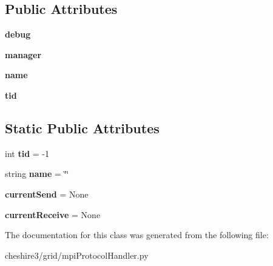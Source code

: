 \subsection*{Public Attributes}
\begin{DoxyCompactItemize}
\item 
\hypertarget{classcheshire3_1_1grid_1_1mpi_protocol_handler_1_1_task_a5792f59d89dd9883421c69d41344d718}{{\bfseries debug}}\label{classcheshire3_1_1grid_1_1mpi_protocol_handler_1_1_task_a5792f59d89dd9883421c69d41344d718}

\item 
\hypertarget{classcheshire3_1_1grid_1_1mpi_protocol_handler_1_1_task_a6640c3bafe2591b1b775970f209ca765}{{\bfseries manager}}\label{classcheshire3_1_1grid_1_1mpi_protocol_handler_1_1_task_a6640c3bafe2591b1b775970f209ca765}

\item 
\hypertarget{classcheshire3_1_1grid_1_1mpi_protocol_handler_1_1_task_a2b6a6214f4827cddb7e50ad04050d86b}{{\bfseries name}}\label{classcheshire3_1_1grid_1_1mpi_protocol_handler_1_1_task_a2b6a6214f4827cddb7e50ad04050d86b}

\item 
\hypertarget{classcheshire3_1_1grid_1_1mpi_protocol_handler_1_1_task_a62df9a6c72b71e3b54729f80d04c2d91}{{\bfseries tid}}\label{classcheshire3_1_1grid_1_1mpi_protocol_handler_1_1_task_a62df9a6c72b71e3b54729f80d04c2d91}

\end{DoxyCompactItemize}
\subsection*{Static Public Attributes}
\begin{DoxyCompactItemize}
\item 
\hypertarget{classcheshire3_1_1grid_1_1mpi_protocol_handler_1_1_task_a60b12279afd01719889331c114b3148c}{int {\bfseries tid} = -\/1}\label{classcheshire3_1_1grid_1_1mpi_protocol_handler_1_1_task_a60b12279afd01719889331c114b3148c}

\item 
\hypertarget{classcheshire3_1_1grid_1_1mpi_protocol_handler_1_1_task_a776b8bf3a31f55fcfb822b3fcd530858}{string {\bfseries name} = \char`\"{}\char`\"{}}\label{classcheshire3_1_1grid_1_1mpi_protocol_handler_1_1_task_a776b8bf3a31f55fcfb822b3fcd530858}

\item 
\hypertarget{classcheshire3_1_1grid_1_1mpi_protocol_handler_1_1_task_afea1820ee16b60809c577860b7330796}{{\bfseries current\-Send} = None}\label{classcheshire3_1_1grid_1_1mpi_protocol_handler_1_1_task_afea1820ee16b60809c577860b7330796}

\item 
\hypertarget{classcheshire3_1_1grid_1_1mpi_protocol_handler_1_1_task_a5bdb7370c7270efcd534e6b0b5be18e3}{{\bfseries current\-Receive} = None}\label{classcheshire3_1_1grid_1_1mpi_protocol_handler_1_1_task_a5bdb7370c7270efcd534e6b0b5be18e3}

\end{DoxyCompactItemize}


The documentation for this class was generated from the following file\-:\begin{DoxyCompactItemize}
\item 
cheshire3/grid/mpi\-Protocol\-Handler.\-py\end{DoxyCompactItemize}
